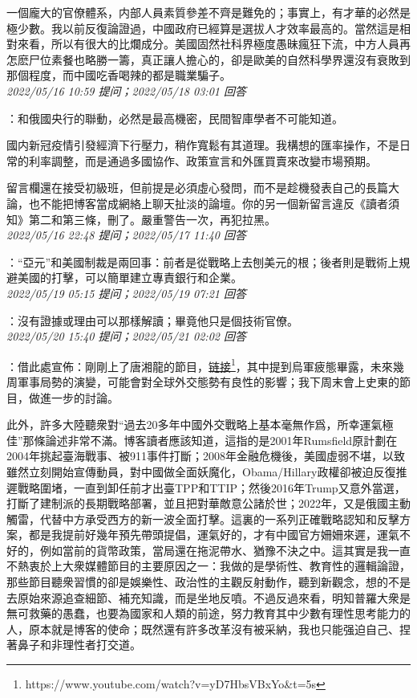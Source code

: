 \documentclass[twocolumn]{ctexart}
\begin{document}
一個龐大的官僚體系，内部人員素質參差不齊是難免的；事實上，有才華的必然是極少數。我以前反復論證過，中國政府已經算是選拔人才效率最高的。當然這是相對來看，所以有很大的比爛成分。美國固然社科界極度愚昧瘋狂下流，中方人員再怎麽尸位素餐也略勝一籌，真正讓人擔心的，卻是歐美的自然科學界還沒有衰敗到那個程度，而中國吃香喝辣的都是職業騙子。
\\

\textit{\hfill\noindent\small 2022/05/16 10:59 提问；2022/05/18 03:01 回答}

：和俄國央行的聯動，必然是最高機密，民間智庫學者不可能知道。

國内新冠疫情引發經濟下行壓力，稍作寬鬆有其道理。我構想的匯率操作，不是日常的利率調整，而是通過多國協作、政策宣言和外匯買賣來改變市場預期。


留言欄還在接受初級班，但前提是必須虛心發問，而不是趁機發表自己的長篇大論，也不能把博客當成網絡上聊天扯淡的論壇。你的另一個新留言違反《讀者須知》第二和第三條，刪了。嚴重警告一次，再犯拉黑。
\\

\textit{\hfill\noindent\small 2022/05/16 22:48 提问；2022/05/17 11:40 回答}

：“亞元”和美國制裁是兩回事：前者是從戰略上去刨美元的根；後者則是戰術上規避美國的打擊，可以簡單建立專責銀行和企業。
\\

\textit{\hfill\noindent\small 2022/05/19 05:15 提问；2022/05/19 07:21 回答}

：沒有證據或理由可以那樣解讀；畢竟他只是個技術官僚。
\\

\textit{\hfill\noindent\small 2022/05/20 15:40 提问；2022/05/21 02:02 回答}

：借此處宣佈：剛剛上了唐湘龍的節目，\href{https://www.youtube.com/watch?v=yD7HbsVBxYo\&t=5s}{链接\footnote{\url{https://www.youtube.com/watch?v=yD7HbsVBxYo\&t=5s}}}，其中提到烏軍疲態畢露，未來幾周軍事局勢的演變，可能會對全球外交態勢有良性的影響；我下周末會上史東的節目，做進一步的討論。

此外，許多大陸聽衆對“過去20多年中國外交戰略上基本毫無作爲，所幸運氣極佳”那條論述非常不滿。博客讀者應該知道，這指的是2001年Rumsfield原計劃在2004年挑起臺海戰事、被911事件打斷；2008年金融危機後，美國虛弱不堪，以致雖然立刻開始宣傳動員，對中國做全面妖魔化，Obama/Hillary政權卻被迫反復推遲戰略圍堵，一直到卸任前才出臺TPP和TTIP；然後2016年Trump又意外當選，打斷了建制派的長期戰略部署，並且把對華敵意公諸於世；2022年，又是俄國主動觸雷，代替中方承受西方的新一波全面打擊。這裏的一系列正確戰略認知和反擊方案，都是我提前好幾年預先帶頭提倡，運氣好的，才有中國官方姍姍來遲，運氣不好的，例如當前的貨幣政策，當局還在拖泥帶水、猶豫不決之中。這其實是我一直不熱衷於上大衆媒體節目的主要原因之一：我做的是學術性、教育性的邏輯論證，那些節目聽衆習慣的卻是娛樂性、政治性的主觀反射動作，聽到新觀念，想的不是去原始來源追查細節、補充知識，而是坐地反噴。不過反過來看，明知普羅大衆是無可救藥的愚蠢，也要為國家和人類的前途，努力教育其中少數有理性思考能力的人，原本就是博客的使命；既然還有許多改革沒有被采納，我也只能强迫自己、捏著鼻子和非理性者打交道。
\end{document}
